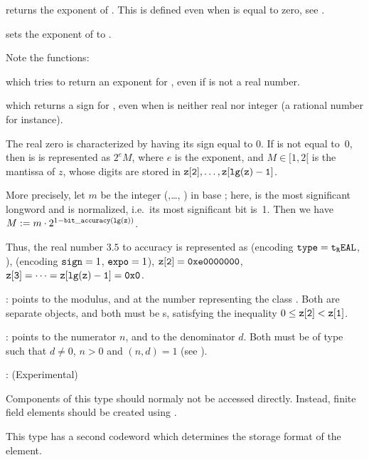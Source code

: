  returns the exponent of .
This is defined even when  is equal to zero, see
.

 sets the exponent of  to .

\noindent Note the functions:

 which tries to return an exponent for ,
even if  is not a real number.

 which returns a sign for , even when
 is neither real nor integer (a rational number for instance).

The real zero is characterized by having its sign equal to 0. If  is
not equal to~0, then is is represented as $2^e M$, where $e$ is the exponent,
and $M\in [1, 2[$ is the mantissa of $z$, whose digits are stored in
${\tt z[2]},\dots, {\tt z[lg(z)-1]}$.

More precisely, let $m$ be the integer (,\dots, )
in base ; here,  is the most significant
longword and is normalized, i.e.~its most significant bit is~1. Then we have
$M := m \cdot 2^{1 - {\tt bit\_accuracy(lg(z))}}$.

Thus, the real number $3.5$ to accuracy  is
represented as  (encoding ${\tt type} = {\tt t_REAL}$, ),
 (encoding ${\tt sign} = 1$, ${\tt expo} = 1$), ${\tt z[2]} =
{\tt 0xe0000000}$, ${\tt z[3]} =\dots = {\tt z[lg(z)-1]} = {\tt 0x0}$.

:
 points to the modulus, and  at the number representing
the class . Both are separate  objects, and both must be
s, satisfying the inequality $0 \le {\tt z[2]} < {\tt z[1]}$.

:%
 points to the numerator $n$, and  to the denominator
$d$. Both must be of type  such that $d\neq 0$, $n > 0$ and
$(n,d) = 1$ (see ).

:%
 (Experimental)

Components of this type should normaly not be accessed directly.
Instead, finite field elements should be created using .

This type has a second codeword  which determines the storage format
of the element.

